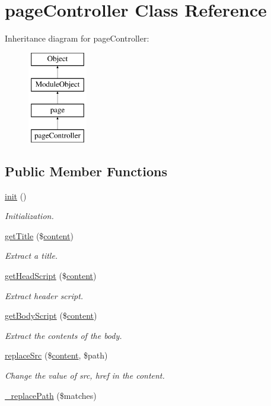 \hypertarget{classpageController}{}\section{page\+Controller Class Reference}
\label{classpageController}
Inheritance diagram for page\+Controller\+:\begin{figure}[H]
\begin{center}
\leavevmode
\includegraphics[height=4.000000cm]{classpageController}
\end{center}
\end{figure}
\subsection*{Public Member Functions}
\begin{DoxyCompactItemize}
\item 
\hyperlink{classpageController_ace5123ac45ab7dc1c9c39f3e1901e0a0}{init} ()
\begin{DoxyCompactList}\small\item\em Initialization. \end{DoxyCompactList}\item 
\hyperlink{classpageController_ab5c9e55fad71e3a0c961b3d84d660f3c}{get\+Title} (\$\hyperlink{classcontent}{content})
\begin{DoxyCompactList}\small\item\em Extract a title. \end{DoxyCompactList}\item 
\hyperlink{classpageController_a7fc1046874a92835813b27613857890c}{get\+Head\+Script} (\$\hyperlink{classcontent}{content})
\begin{DoxyCompactList}\small\item\em Extract header script. \end{DoxyCompactList}\item 
\hyperlink{classpageController_a8c5c1bd477ffc4beda5af3b6d3cee63f}{get\+Body\+Script} (\$\hyperlink{classcontent}{content})
\begin{DoxyCompactList}\small\item\em Extract the contents of the body. \end{DoxyCompactList}\item 
\hyperlink{classpageController_a9e6b4820d017d82f1f81598254da4092}{replace\+Src} (\$\hyperlink{classcontent}{content}, \$path)
\begin{DoxyCompactList}\small\item\em Change the value of src, href in the content. \end{DoxyCompactList}\item 
\hyperlink{classpageController_abd8a05c83337866bd8e06057c0e6dc4f}{\+\_\+replace\+Path} (\$matches)
\end{DoxyCompactItemize}
